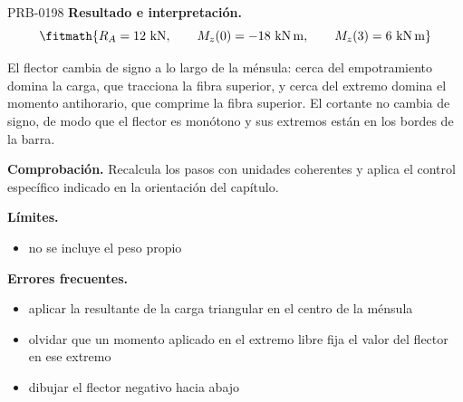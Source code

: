 \begin{studiumworked}{PRB-0198}
\textbf{Resultado e interpretación.}\[\fitmath{R_A = 12\ \mathrm{kN},\qquad M_z(0) = -18\ \mathrm{kN\,m},\qquad M_z(3) = 6\ \mathrm{kN\,m}}\]

El flector cambia de signo a lo largo de la ménsula: cerca del empotramiento domina la carga, que tracciona la fibra superior, y cerca del extremo domina el momento antihorario, que comprime la fibra superior. El cortante no cambia de signo, de modo que el flector es monótono y sus extremos están en los bordes de la barra.

\par\textbf{Comprobación.} Recalcula los pasos con unidades coherentes y aplica el control específico indicado en la orientación del capítulo.

\textbf{Límites.}\begin{itemize}\item no se incluye el peso propio\end{itemize}

\textbf{Errores frecuentes.}\begin{itemize}\item aplicar la resultante de la carga triangular en el centro de la ménsula
\item olvidar que un momento aplicado en el extremo libre fija el valor del flector en ese extremo
\item dibujar el flector negativo hacia abajo\end{itemize}

\end{studiumworked}

\Needspace{.3\textheight}

